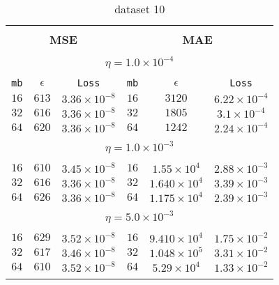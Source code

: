 \begin{table}[]
  \small
  
\begin{center}
\caption{dataset 10}\label{tab:mae3}
\begin{tabular}{@{}ccc|ccc@{}}

\hline\\[-11pt]
\hline\\[-6.5pt]
\multicolumn{3}{c}{\bf MSE} & \multicolumn{3}{c}{\bf MAE } \\[5pt]
\hline\\[-11pt]
\multicolumn{6}{c}{$\eta = 1.0\times 10^{-4}$} \\[5pt]
\hline\\[-11pt]
\texttt{mb} & \texttt{$\epsilon$} & \texttt{Loss} & \texttt{mb} & \texttt{$\epsilon$} & \texttt{Loss} \\[1pt]
$16$ & $613$ & $3.36\times 10^{-8}$  &  $16$ & $3120$ & $6.22\times 10^{-4}$    \\ [1pt]
$32$ & $616$ & $3.36\times 10^{-8}$  &  $32$ & $1805$ & $3.1\times 10^{-4}$     \\ [1pt]
$64$ & $620$ & $3.36\times 10^{-8}$  &  $64$ & $1242$ & $2.24\times 10^{-4}$    \\ [1pt]

\hline\\[-11pt]
\multicolumn{6}{c}{$\eta = 1.0\times 10^{-3}$} \\[5pt]
\hline\\[-11pt]
$16$ & $610$ & $3.45\times 10^{-8}$  &  $16$ & $1.55\times 10^{4}$ & $2.88\times 10^{-3}$   \\ [1pt]
$32$ & $616$ & $3.36\times 10^{-8}$  &  $32$ & $1.640\times 10^{4}$ & $3.39\times 10^{-3}$   \\ [1pt]
$64$ & $626$ & $3.36\times 10^{-8}$  &  $64$ & $1.175\times 10^{4}$ & $2.39\times 10^{-3}$   \\ [1pt]
\hline\\[-11pt]
\multicolumn{6}{c}{$\eta = 5.0\times 10^{-3}$} \\[5pt]
\hline\\[-11pt]
$16$ & $629$ & $3.52\times 10^{-8}$  &  $16$ & $9.410\times 10^{4}$ & $1.75\times 10^{-2}$   \\ [1pt]
$32$ & $617$ & $3.46\times 10^{-8}$  &  $32$ & $1.048\times 10^{5}$ & $3.31\times 10^{-2}$  \\ [1pt]
$64$ & $610$ & $3.52\times 10^{-8}$  &  $64$ & $5.29\times 10^{4}$ & $1.33\times 10^{-2}$   \\ [1pt]
\hline\\[-11pt]


\end{tabular}
\end{center}
\end{table}
